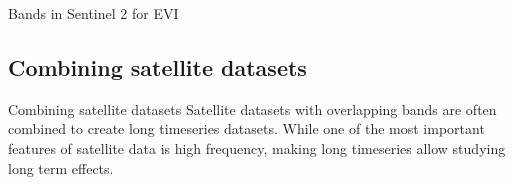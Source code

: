 \documentclass[aspectratio=169]{beamer} %
\begin{document}
\begin{frame}{Bands in Sentinel 2 for EVI}
    \end{frame}

    \subsection{Combining satellite datasets}

    \begin{frame}{Combining satellite datasets}
      Satellite datasets with overlapping bands are often combined to create long timeseries datasets. While one of the most important features of satellite data is high frequency, making long timeseries allow studying long term effects.  
      
    \end{frame}
    
\end{document}
